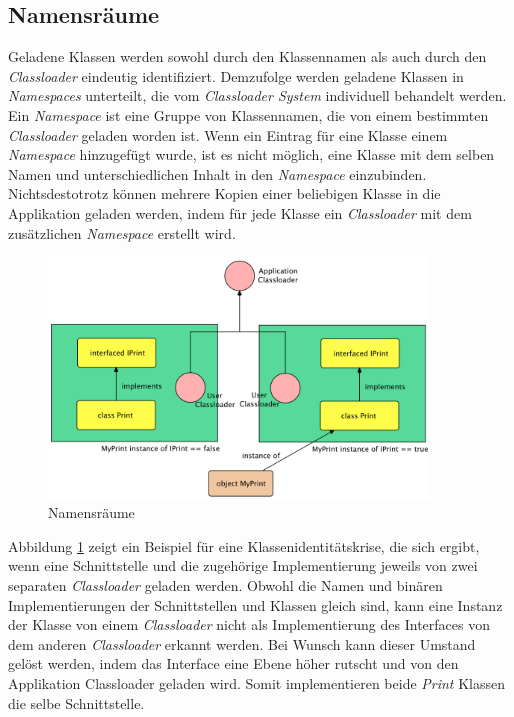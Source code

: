 \subsection{Namensräume}
Geladene Klassen werden sowohl durch den Klassennamen als auch durch den \textit{Classloader} eindeutig identifiziert. Demzufolge werden geladene Klassen in \textit{Namespaces} unterteilt, die vom \textit{Classloader System} individuell behandelt werden.
\newline
Ein \textit{Namespace} ist eine Gruppe von Klassennamen, die von einem bestimmten \textit{Classloader} geladen worden ist. Wenn ein Eintrag für eine Klasse einem \textit{Namespace} hinzugefügt wurde, ist es nicht möglich, eine Klasse mit dem selben Namen und unterschiedlichen Inhalt in den \textit{Namespace} einzubinden. Nichtsdestotrotz können mehrere Kopien einer beliebigen Klasse in die Applikation geladen werden, indem für jede Klasse ein \textit{Classloader} mit dem zusätzlichen \textit{Namespace} erstellt wird. 
\begin{figure}[h]
  \centering
  \includegraphics[width=0.9\textwidth]{material/images/namespaces.png}
  \caption{Namensräume}
  \label{fig:namespaces}
\end{figure}
\newline
Abbildung \ref{fig:namespaces} zeigt ein Beispiel für eine Klassenidentitätskrise, die sich ergibt, wenn eine Schnittstelle und die zugehörige Implementierung jeweils von zwei separaten \textit{Classloader} geladen werden. Obwohl die Namen und binären Implementierungen der Schnittstellen und Klassen gleich sind, kann eine Instanz der Klasse von einem \textit{Classloader} nicht als Implementierung des Interfaces von dem anderen \textit{Classloader} erkannt werden. \newline 
Bei Wunsch kann dieser Umstand gelöst werden, indem das Interface eine Ebene höher rutscht und von den Applikation Classloader geladen wird. Somit implementieren beide \textit{Print} Klassen die selbe Schnittstelle.   
